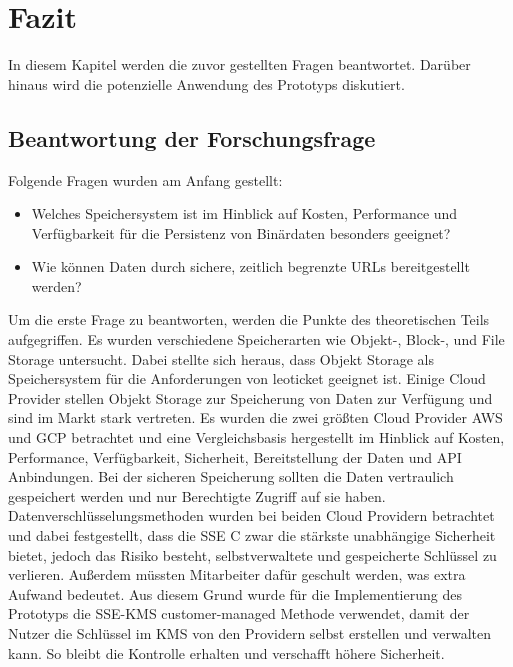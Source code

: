 \chapter{Fazit}

In diesem Kapitel werden die zuvor gestellten Fragen beantwortet. Darüber hinaus wird die potenzielle Anwendung des Prototyps diskutiert.

\section{Beantwortung der Forschungsfrage}

Folgende Fragen wurden am Anfang gestellt:

\begin{itemize}
	\item Welches Speichersystem ist im Hinblick auf Kosten, Performance und Verfügbarkeit für die Persistenz von Binärdaten besonders geeignet? 
	\item Wie können Daten durch sichere, zeitlich begrenzte URLs bereitgestellt werden?
\end{itemize}

Um die erste Frage zu beantworten, werden die Punkte des theoretischen Teils aufgegriffen. Es wurden verschiedene Speicherarten wie Objekt-, Block-, und File Storage untersucht. Dabei stellte sich heraus, dass Objekt Storage als Speichersystem für die Anforderungen von leoticket geeignet ist. Einige Cloud Provider stellen Objekt Storage zur Speicherung von Daten zur Verfügung und sind im Markt stark vertreten. Es wurden die zwei größten Cloud Provider AWS und GCP betrachtet und eine Vergleichsbasis hergestellt im Hinblick auf Kosten, Performance, Verfügbarkeit, Sicherheit, Bereitstellung der Daten und API Anbindungen. Bei der sicheren Speicherung sollten die Daten vertraulich gespeichert werden und nur Berechtigte Zugriff auf sie haben.\\

 Datenverschlüsselungsmethoden wurden bei beiden Cloud Providern betrachtet und dabei festgestellt, dass die SSE C zwar die stärkste unabhängige Sicherheit bietet, jedoch das Risiko besteht, selbstverwaltete und gespeicherte Schlüssel zu verlieren. Außerdem müssten Mitarbeiter dafür geschult werden, was extra Aufwand bedeutet. Aus diesem Grund wurde für die Implementierung des Prototyps die SSE-KMS customer-managed Methode verwendet, damit der Nutzer die Schlüssel im KMS von den Providern selbst erstellen und verwalten kann. So bleibt die Kontrolle erhalten und verschafft höhere Sicherheit.\\ 
 
